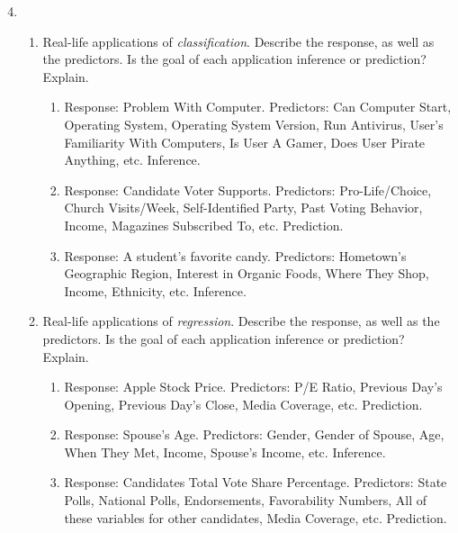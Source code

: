 \documentclass[11pt]{article}
\begin{document}
\begin{enumerate}
  \setcounter{enumi}{3}
  \item
    \begin{enumerate}
      \item Real-life applications of \emph{classification}. Describe the response, as well as the predictors. Is the goal of each application inference or prediction? Explain.
        \begin{enumerate}
          \item Response: Problem With Computer. Predictors: Can Computer Start, Operating System, Operating System Version, Run Antivirus, User's Familiarity With Computers, Is User A Gamer, Does User Pirate Anything, etc. Inference.
          \item Response: Candidate Voter Supports. Predictors: Pro-Life/Choice, Church Visits/Week, Self-Identified Party, Past Voting Behavior, Income, Magazines Subscribed To, etc. Prediction.
          \item Response: A student's favorite candy. Predictors: Hometown's Geographic Region, Interest in Organic Foods, Where They Shop, Income, Ethnicity, etc. Inference.
        \end{enumerate}
        
      \item Real-life applications of \emph{regression}. Describe the response, as well as the predictors. Is the goal of each application inference or prediction? Explain.
       \begin{enumerate}
          \item Response: Apple Stock Price. Predictors: P/E Ratio, Previous Day's Opening, Previous Day's Close, Media Coverage, etc. Prediction.
          \item Response: Spouse's Age. Predictors: Gender, Gender of Spouse, Age, When They Met, Income, Spouse's Income, etc. Inference.
          \item Response: Candidates Total Vote Share Percentage. Predictors: State Polls, National Polls, Endorsements, Favorability Numbers, All of these variables for other candidates, Media Coverage, etc. Prediction.
        \end{enumerate}
        

\end{enumerate}
\end{enumerate}
\end{document}
